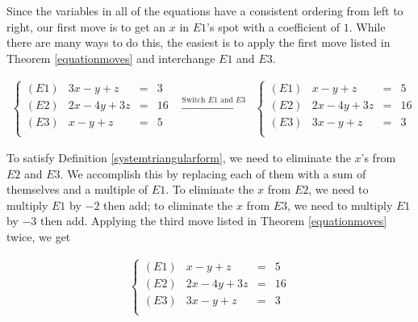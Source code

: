 \documentclass{ximera}
\begin{document}
\begin{example}
\begin{enumerate}
Since the variables in all of the equations have a consistent ordering from left to right, our first move is to get an $x$ in $E1$'s spot with a coefficient of $1$.  While there are many ways to do this, the easiest is to apply the first move listed in Theorem \ref{equationmoves} and interchange $E1$ and $E3$.

\[\begin{array}{ccc}

\left\{  \begin{array}{lrcr}

(E1) & 3x-y+z & = & 3 \\
(E2)  & 2x-4y+3z & = & 16 \\
(E3)  &  x-y+z & = & 5 \\ 

\end{array} \right.

&
\xrightarrow{\text{Switch $E1$ and $E3$}}

&

\left\{ \begin{array}{lrcr}

(E1) & x-y+z & = & 5 \\
(E2) & 2x-4y+3z & = & 16 \\
(E3) & 3x-y+z & = & 3 \\

\end{array} \right.

\end{array}\]



To satisfy Definition \ref{systemtriangularform}, we need to eliminate the $x$'s from $E2$ and $E3$.  We accomplish this by replacing each of them with a sum of themselves and a multiple of $E1$.  To eliminate the $x$ from $E2$, we need to multiply $E1$ by $-2$ then add;  to eliminate the $x$ from $E3$, we need to multiply $E1$ by $-3$ then add.  Applying the third move listed in Theorem \ref{equationmoves} twice, we get

\[ \begin{array}{ccc}

\left\{ 

\begin{array}{lrcr}

(E1) & x-y+z & = & 5 \\
(E2) & 2x-4y+3z & = & 16 \\
(E3) & 3x-y+z & = & 3 \\

\end{array} 


\end{array}\]
\end{enumerate}
\end{example}
\end{document}
